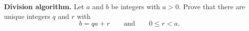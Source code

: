 \textbf{Division algorithm.} Let $a$ and $b$ be integers with $a>0$. Prove that there are unique integers $q$ and $r$ with
\[
b=qa+r\qquad\text{and}\qquad0\le r<a .
\]
